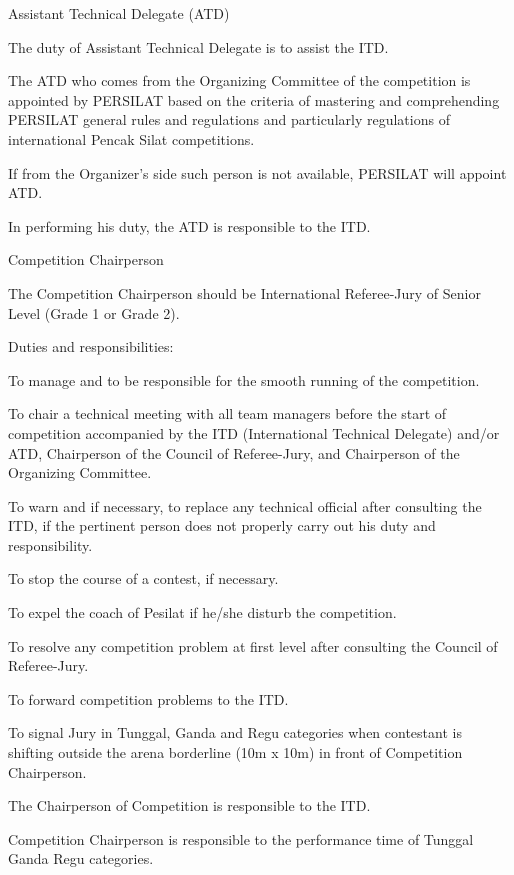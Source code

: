 \begin{legal}
\item Assistant Technical Delegate (ATD)
    \begin{legal}
    \item The duty of Assistant Technical Delegate is to assist the ITD.
    \item The ATD who comes from the Organizing Committee of the competition is
appointed by PERSILAT based on the criteria of mastering and comprehending
PERSILAT general rules and regulations and particularly regulations of
international Pencak Silat competitions.
    \item If from the Organizer’s side such person is not available, PERSILAT will appoint ATD.
    \item In performing his duty, the ATD is responsible to the ITD.
    \end{legal}

\item  Competition Chairperson
    \begin{legal}
    \item The Competition Chairperson should be International Referee-Jury of Senior Level 
        (Grade 1 or Grade 2).
    \item Duties and responsibilities:
        \begin{legal}
        \item To manage and to be responsible for the smooth running of the competition.
        \item To chair a technical meeting with all team managers before the start of
competition accompanied by the ITD (International Technical Delegate)
and/or ATD, Chairperson of the Council of Referee-Jury, and Chairperson of
the Organizing Committee.
        \item To warn and if necessary, to replace any technical official after consulting
the ITD, if the pertinent person does not properly carry out his duty and
responsibility.
        \item To stop the course of a contest, if necessary.
        \item To expel the coach of Pesilat if he/she disturb the competition.
        \item To resolve any competition problem at first level after consulting the Council of Referee-Jury.
        \item To forward competition problems to the ITD.
        \item To signal Jury in Tunggal, Ganda and Regu categories when contestant is
        shifting outside the arena borderline (10m x 10m) in front of Competition
        Chairperson.
        \item The Chairperson of Competition is responsible to the ITD.
        \item Competition Chairperson is responsible to the performance time of Tunggal Ganda Regu categories.
        \end{legal}
    \end{legal}


\end{legal}
